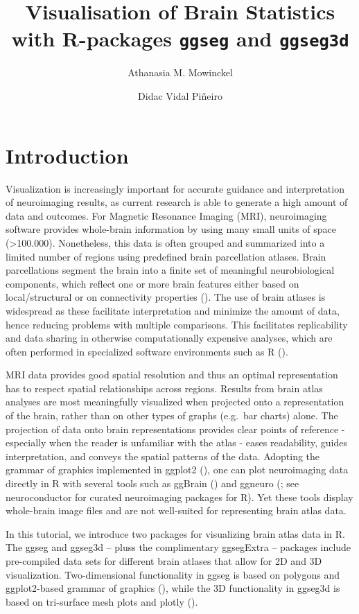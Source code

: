 \documentclass[fleqn,10pt]{wlpeerj} %
\title{Visualisation of Brain Statistics with R-packages \texttt{ggseg} and \texttt{ggseg3d}}
\author[1]{Athanasia M. Mowinckel}
\author[1]{Didac Vidal Piñeiro}
\affil[1]{Center for Lifespan Changes in Brain and Cognition, Univeristy of Oslo, PO. box 1094 Blindern, 0317 Oslo, Norway}
\begin{document}
\flushbottom
\maketitle
\thispagestyle{empty}

\hypertarget{introduction}{%
\section{Introduction}\label{introduction}}

Visualization is increasingly important for accurate guidance and interpretation of neuroimaging results, as current research is able to generate a high amount of data and outcomes.
For Magnetic Resonance Imaging (MRI), neuroimaging software provides whole-brain information by using many small units of space (\textgreater100.000).
Nonetheless, this data is often grouped and summarized into a limited number of regions using predefined brain parcellation atlases.
Brain parcellations segment the brain into a finite set of meaningful neurobiological components, which reflect one or more brain features either based on local/structural or on connectivity properties (\citet{eickhoff_2018}).
The use of brain atlases is widespread as these facilitate interpretation and minimize the amount of data, hence reducing problems with multiple comparisons.
This facilitates replicability and data sharing in otherwise computationally expensive analyses, which are often performed in specialized software environments such as R (\citet{R}).

MRI data provides good spatial resolution and thus an optimal representation has to respect spatial relationships across regions.
Results from brain atlas analyses are most meaningfully visualized when projected onto a representation of the brain, rather than on other types of graphs (e.g.~bar charts) alone.
The projection of data onto brain representations provides clear points of reference - especially when the reader is unfamiliar with the atlas - eases readability, guides interpretation, and conveys the spatial patterns of the data.
Adopting the grammar of graphics implemented in ggplot2 (\citet{ggplot}), one can plot neuroimaging data directly in R with several tools such as ggBrain (\citet{ggBrain}) and ggneuro (\citet{ggneuro}; see neuroconductor \citeyearpar{neuroconductor} for curated neuroimaging packages for R).
Yet these tools display whole-brain image files and are not well-suited for representing brain atlas data.

In this tutorial, we introduce two packages for visualizing brain atlas data in R.
The ggseg and ggseg3d -- pluss the complimentary ggsegExtra -- packages include pre-compiled data sets for different brain atlases that allow for 2D and 3D visualization.
Two-dimensional functionality in ggseg is based on polygons and ggplot2-based grammar of graphics (\citet{ggplot}), while the 3D functionality in ggseg3d is based on tri-surface mesh plots and plotly (\citet{plotly}).
\end{document}
